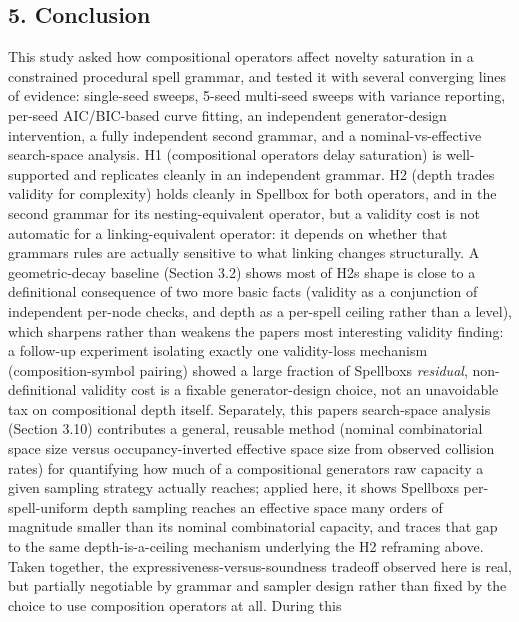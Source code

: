 \documentclass[
  10pt,
  twocolumn]{article}
\begin{document}
\subsection{5. Conclusion}\label{5-conclusion}

This study asked how compositional operators affect novelty saturation
in a constrained procedural spell grammar, and tested it with several
converging lines of evidence: single-seed sweeps, 5-seed multi-seed
sweeps with variance reporting, per-seed AIC/BIC-based curve fitting, an
independent generator-design intervention, a fully independent second
grammar, and a nominal-vs-effective search-space analysis. H1
(compositional operators delay saturation) is well-supported and
replicates cleanly in an independent grammar. H2 (depth trades validity
for complexity) holds cleanly in Spellbox for both operators, and in the
second grammar for its nesting-equivalent operator, but a validity cost
is not automatic for a linking-equivalent operator: it depends on
whether that grammar\textquotesingle s rules are actually sensitive to
what linking changes structurally. A geometric-decay baseline (Section
3.2) shows most of H2\textquotesingle s shape is close to a definitional
consequence of two more basic facts (validity as a conjunction of
independent per-node checks, and depth as a per-spell ceiling rather
than a level), which sharpens rather than weakens the
paper\textquotesingle s most interesting validity finding: a follow-up
experiment isolating exactly one validity-loss mechanism
(composition-symbol pairing) showed a large fraction of
Spellbox\textquotesingle s \emph{residual}, non-definitional validity
cost is a fixable generator-design choice, not an unavoidable tax on
compositional depth itself. Separately, this paper\textquotesingle s
search-space analysis (Section 3.10) contributes a general, reusable
method (nominal combinatorial space size versus occupancy-inverted
effective space size from observed collision rates) for quantifying how
much of a compositional generator\textquotesingle s raw capacity a given
sampling strategy actually reaches; applied here, it shows
Spellbox\textquotesingle s per-spell-uniform depth sampling reaches an
effective space many orders of magnitude smaller than its nominal
combinatorial capacity, and traces that gap to the same
depth-is-a-ceiling mechanism underlying the H2 reframing above. Taken
together, the expressiveness-versus-soundness tradeoff observed here is
real, but partially negotiable by grammar and sampler design rather than
fixed by the choice to use composition operators at all. During this
\end{document}
